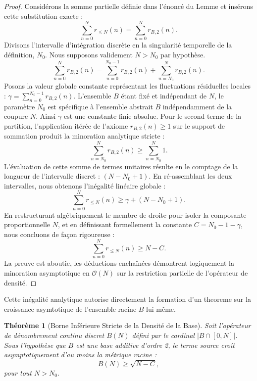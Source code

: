 \documentclass[12pt,a4paper]{article}
\newtheorem{theorem}{Th\'eor\`eme}[section]
\begin{document}
\begin{proof}
Consid\'erons la somme partielle d\'efinie dans l'\'enonc\'e du Lemme et ins\'erons cette substitution exacte :
\begin{equation}
\sum_{n=0}^N r_{\le N}(n) = \sum_{n=0}^N r_{B,2}(n).
\end{equation}
Divisons l'intervalle d'int\'egration discr\`ete en la singularit\'e temporelle de la d\'efinition, $N_0$. Nous supposons validement $N > N_0$ par hypoth\`ese.
\begin{equation}
\sum_{n=0}^N r_{B,2}(n) = \sum_{n=0}^{N_0 - 1} r_{B,2}(n) + \sum_{n=N_0}^N r_{B,2}(n).
\end{equation}
Posons la valeur globale constante repr\'esentant les fluctuations r\'esiduelles locales : $\gamma = \sum_{n=0}^{N_0 - 1} r_{B,2}(n)$. L'ensemble $B$ \'etant fix\'e et ind\'ependant de $N$, le param\`etre $N_0$ est sp\'ecifique \`a l'ensemble abstrait $B$ ind\'ependamment de la coupure $N$. Ainsi $\gamma$ est une constante finie absolue.
Pour le second terme de la partition, l'application it\'er\'ee de l'axiome $r_{B,2}(n) \ge 1$ sur le support de sommation produit la minoration analytique stricte :
\begin{equation}
\sum_{n=N_0}^N r_{B,2}(n) \ge \sum_{n=N_0}^N 1.
\end{equation}
L'\'evaluation de cette somme de termes unitaires r\'esulte en le comptage de la longueur de l'intervalle discret : $(N - N_0 + 1)$.
En r\'e-assemblant les deux intervalles, nous obtenons l'in\'egalit\'e lin\'eaire globale :
\begin{equation}
\sum_{n=0}^N r_{\le N}(n) \ge \gamma + (N - N_0 + 1).
\end{equation}
En restructurant alg\'ebriquement le membre de droite pour isoler la composante proportionnelle $N$, et en d\'efinissant formellement la constante $C = N_0 - 1 - \gamma$, nous concluons de fa\c{c}on rigoureuse :
\begin{equation}
\sum_{n=0}^N r_{\le N}(n) \ge N - C.
\end{equation}
La preuve est aboutie, les d\'eductions encha\^in\'ees d\'emontrent logiquement la minoration asymptotique en $\mathcal{O}(N)$ sur la restriction partielle de l'op\'erateur de densit\'e.
\end{proof}

Cette in\'egalit\'e analytique autorise directement la formation d'un theoreme sur la croissance asymtotique de l'ensemble racine $B$ lui-m\^eme.

\begin{theorem}[Borne Inf\'erieure Stricte de la Densit\'e de la Base]
Soit l'op\'erateur de d\'enombrement continu discret $B(N)$ d\'efini par le cardinal $|B \cap [0, N]|$. Sous l'hypoth\`ese que $B$ est une base additive d'ordre 2, le terme source cro\^it asymptotiquement d'au moins la m\'etrique racine :
\begin{equation}
B(N) \ge \sqrt{N - C},
\end{equation}
pour tout $N > N_0$.
\end{theorem}
\end{document}
